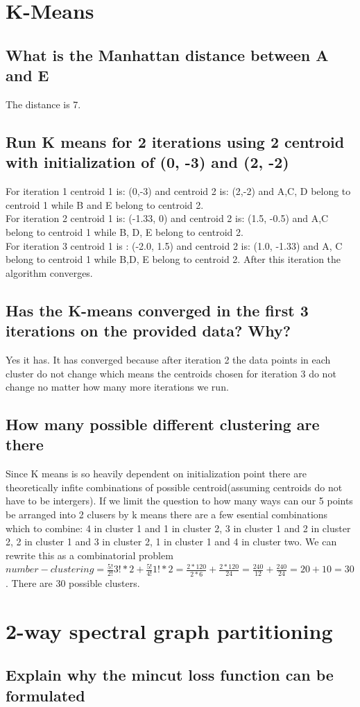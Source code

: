 \documentclass[11pt]{article}
\begin{document}
\section{K-Means}
\subsection{What is the Manhattan distance between A and E}
The distance is 7.
\subsection{Run K means for 2 iterations using 2 centroid with initialization of (0, -3) and (2, -2)}
For iteration 1 centroid 1 is: (0,-3) and centroid 2 is: (2,-2) and A,C, D belong to centroid 1 while B and E belong to centroid 2. \\
For iteration 2 centroid 1 is: (-1.33, 0) and centroid 2 is: (1.5, -0.5) and A,C belong to centroid 1 while B, D, E belong to centroid 2. \\
For iteration 3 centroid 1 is : (-2.0, 1.5) and centroid 2 is: (1.0, -1.33) and A, C belong to centroid 1 while B,D, E belong to centroid 2. After this iteration the algorithm converges. 
\subsection{Has the K-means converged in the first 3 iterations on the provided data? Why? }
Yes it has. It has converged because after iteration 2 the data points in each cluster do not change which means the centroids chosen for iteration 3 do not change no matter how many more iterations we run. 
\subsection{How many possible different clustering are there}
Since K means is so heavily dependent on initialization point there are theoretically infite combinations of possible centroid(assuming centroids do not have to be intergers). If we limit the question to how many ways can our 5 points be arranged into 2 clusers by k means there are a few esential combinations which to combine: 4 in cluster 1 and 1 in cluster 2, 3 in cluster 1 and 2 in cluster 2, 2 in cluster 1 and 3 in cluster 2, 1 in cluster 1 and 4 in cluster two. We can rewrite this as a combinatorial problem $number-clustering=\frac{5!}{2!}{3!}*2+\frac{5!}{4!}{1!}*2= \frac{2*120}{2*6} + \frac{2*120}{24}= \frac{240}{12} + \frac{240}{24} = 20 + 10 = 30$. There are 30 possible clusters.
\section{2-way spectral graph partitioning}
\subsection{Explain why the mincut loss function can be formulated }
\end{document}
